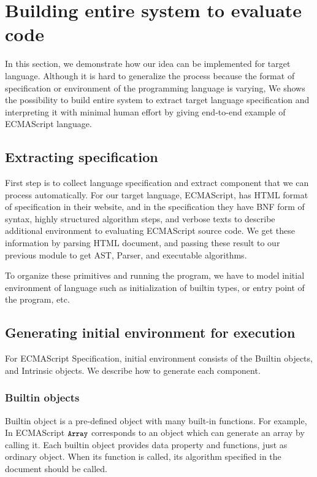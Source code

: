 \section{Building entire system to evaluate code}

In this section, we demonstrate how our idea can be implemented for target language. Although it is hard to generalize the process because the format of specification or
environment of the programming language is varying, We shows the possibility to build entire system to extract target language specification and interpreting it with minimal human effort by giving end-to-end example of ECMAScript language.

\subsection{Extracting specification}
First step is to collect language specification and extract component that we can process automatically. For our target language, ECMAScript, has HTML format of specification in their website, and
in the specification they have BNF form of syntax, highly structured algorithm steps, and verbose texts to describe additional environment to evaluating ECMAScript source code.
We get these information by parsing HTML document, and passing these result to our previous module to get AST, Parser, and executable algorithms.

To organize these primitives and running the program, we have to model initial environment of language such as initialization of builtin types, or entry point of the program, etc.

\subsection{Generating initial environment for execution}
For ECMAScript Specification, initial environment consists of the Builtin objects, and Intrinsic objects. We describe how to generate each component.

\subsubsection{Builtin objects}

 Builtin object is a pre-defined object with many built-in functions. For example, In ECMAScript \( \texttt{\small Array} \) corresponds to an object which can generate an array by
 calling it. Each builtin object provides data property and functions, just as ordinary object. When its function is called,
 its algorithm specified in the document should be called.
 
